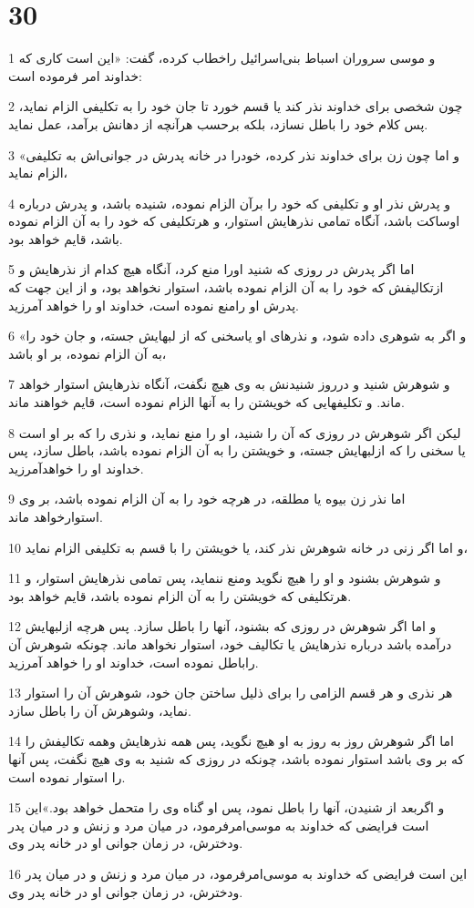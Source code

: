 \chapter{30}

\par 1 و موسی سروران اسباط بنی‌اسرائیل راخطاب کرده، گفت: «این است کاری که خداوند امر فرموده است:
\par 2 چون شخصی برای خداوند نذر کند یا قسم خورد تا جان خود را به تکلیفی الزام نماید، پس کلام خود را باطل نسازد، بلکه برحسب هر‌آنچه از دهانش برآمد، عمل نماید.
\par 3 «و اما چون زن برای خداوند نذر کرده، خودرا در خانه پدرش در جوانی‌اش به تکلیفی الزام نماید،
\par 4 و پدرش نذر او و تکلیفی که خود را برآن الزام نموده، شنیده باشد، و پدرش درباره اوساکت باشد، آنگاه تمامی نذرهایش استوار، و هرتکلیفی که خود را به آن الزام نموده باشد، قایم خواهد بود.
\par 5 اما اگر پدرش در روزی که شنید اورا منع کرد، آنگاه هیچ کدام از نذرهایش و ازتکالیفش که خود را به آن الزام نموده باشد، استوار نخواهد بود، و از این جهت که پدرش او رامنع نموده است، خداوند او را خواهد آمرزید.
\par 6 «و اگر به شوهری داده شود، و نذرهای او یاسخنی که از لبهایش جسته، و جان خود را به آن الزام نموده، بر او باشد،
\par 7 و شوهرش شنید و درروز شنیدنش به وی هیچ نگفت، آنگاه نذرهایش استوار خواهد ماند. و تکلیفهایی که خویشتن را به آنها الزام نموده است، قایم خواهند ماند.
\par 8 لیکن اگر شوهرش در روزی که آن را شنید، او را منع نماید، و نذری را که بر او است یا سخنی را که ازلبهایش جسته، و خویشتن را به آن الزام نموده باشد، باطل سازد، پس خداوند او را خواهدآمرزید.
\par 9 اما نذر زن بیوه یا مطلقه، در هر‌چه خود را به آن الزام نموده باشد، بر وی استوارخواهد ماند.
\par 10 و اما اگر زنی در خانه شوهرش نذر کند، یا خویشتن را با قسم به تکلیفی الزام نماید،
\par 11 و شوهرش بشنود و او را هیچ نگوید ومنع ننماید، پس تمامی نذرهایش استوار، و هرتکلیفی که خویشتن را به آن الزام نموده باشد، قایم خواهد بود.
\par 12 و اما اگر شوهرش در روزی که بشنود، آنها را باطل سازد. پس هر‌چه ازلبهایش درآمده باشد درباره نذرهایش یا تکالیف خود، استوار نخواهد ماند. چونکه شوهرش آن راباطل نموده است، خداوند او را خواهد آمرزید.
\par 13 هر نذری و هر قسم الزامی را برای ذلیل ساختن جان خود، شوهرش آن را استوار نماید، وشوهرش آن را باطل سازد.
\par 14 اما اگر شوهرش روز به روز به او هیچ نگوید، پس همه نذرهایش وهمه تکالیفش را که بر وی باشد استوار نموده باشد، چونکه در روزی که شنید به وی هیچ نگفت، پس آنها را استوار نموده است.
\par 15 و اگربعد از شنیدن، آنها را باطل نمود، پس او گناه وی را متحمل خواهد بود.»این است فرایضی که خداوند به موسی‌امرفرمود، در میان مرد و زنش و در میان پدر ودخترش، در زمان جوانی او در خانه پدر وی.
\par 16 این است فرایضی که خداوند به موسی‌امرفرمود، در میان مرد و زنش و در میان پدر ودخترش، در زمان جوانی او در خانه پدر وی.
 
